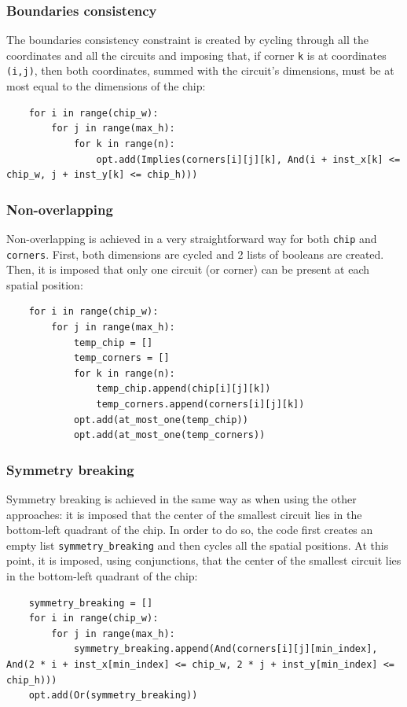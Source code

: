 \documentclass[a4paper, 12pt]{article}
\begin{document}
\subsubsection{Boundaries consistency}

The boundaries consistency constraint is created by cycling through all the coordinates and all the circuits and imposing that, if corner \verb|k| is at coordinates \verb|(i,j)|, then both coordinates, summed with the circuit's dimensions, must be at most equal to the dimensions of the chip:
\begin{verbatim}
    for i in range(chip_w):
        for j in range(max_h):
            for k in range(n):
                opt.add(Implies(corners[i][j][k], And(i + inst_x[k] <= chip_w, j + inst_y[k] <= chip_h)))
\end{verbatim}


\subsubsection{Non-overlapping}

Non-overlapping is achieved in a very straightforward way for both \verb|chip| and \verb|corners|. First, both dimensions are cycled and 2 lists of booleans are created. Then, it is imposed that only one circuit (or corner) can be present at each spatial position:
\begin{verbatim}
    for i in range(chip_w):
        for j in range(max_h):
            temp_chip = []
            temp_corners = []
            for k in range(n):
                temp_chip.append(chip[i][j][k])
                temp_corners.append(corners[i][j][k])
            opt.add(at_most_one(temp_chip))
            opt.add(at_most_one(temp_corners))
\end{verbatim}


\subsubsection{Symmetry breaking}

Symmetry breaking is achieved in the same way as when using the other approaches: it is imposed that the center of the smallest circuit lies in the bottom-left quadrant of the chip. In order to do so, the code first creates an empty list \verb|symmetry_breaking| and then cycles all the spatial positions. At this point, it is imposed, using conjunctions, that the center of the smallest circuit lies in the bottom-left quadrant of the chip:
\begin{verbatim}
    symmetry_breaking = []
    for i in range(chip_w):
        for j in range(max_h):
            symmetry_breaking.append(And(corners[i][j][min_index], And(2 * i + inst_x[min_index] <= chip_w, 2 * j + inst_y[min_index] <= chip_h)))
    opt.add(Or(symmetry_breaking))
\end{verbatim}
\end{document}
